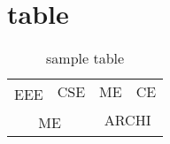 \documentclass{article}
\begin{document}
\section{table}
\begin{table}[h]
\begin{center}
\begin{tabular}{|c|c|c|c|}
\hline
\multirow{2}{*}{EEE} & CSE & ME & CE\\
\cline{2-4}
& & \multicolumn{2}{|c|}{\multirow{2}{*}{ARCHI}}\\
\cline{1-2}
\multicolumn{2}{|c|}{ME} & \multicolumn{2}{c|}{}\\
\hline
\end{tabular}
\caption{sample table}
\label{table:sam_tab}
\end{center}
\end{table}
\end{document}
